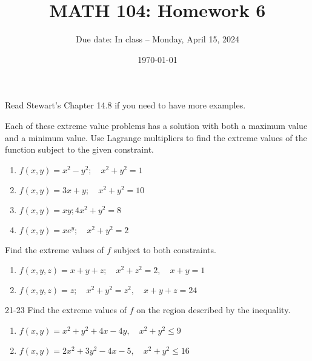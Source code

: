 \documentclass[12pt]{amsart}
\title{ MATH 104: Homework 6}
\author{Due date: In class -- Monday, April 15, 2024}
\date{\today}
\begin{document}
\maketitle

Read Stewart's Chapter 14.8 if you need to have more examples.

\begin{problem}
 Each of these extreme value problems has a solution with both a maximum value and a minimum value. Use Lagrange multipliers to find the extreme values of the function subject to the given constraint.
 \begin{enumerate}
     \item  $f(x, y)=x^2-y^2 ; \quad x^2+y^2=1$
     \item  $f(x, y)=3 x+y ; \quad x^2+y^2=10$
     \item $f(x, y)=x y ; 4 x^2+y^2=8$
     \item  $f(x, y)=x e^y ; \quad x^2+y^2=2$
 \end{enumerate}
\end{problem}

\begin{problem}
    Find the extreme values of $f$ subject to both constraints.
    \begin{enumerate}
        \item  $f(x, y, z)=x+y+z ; \quad x^2+z^2=2, \quad x+y=1$
        \item  $f(x, y, z)=z ; \quad x^2+y^2=z^2, \quad x+y+z=24$
    \end{enumerate}
\end{problem}

\begin{problem}
    21-23 Find the extreme values of $f$ on the region described by the inequality.
    \begin{enumerate}
        \item  $f(x, y)=x^2+y^2+4 x-4 y, \quad x^2+y^2 \leqslant 9$
        \item  $f(x, y)=2 x^2+3 y^2-4 x-5, \quad x^2+y^2 \leqslant 16$
    \end{enumerate}
\end{problem}
\end{document}

